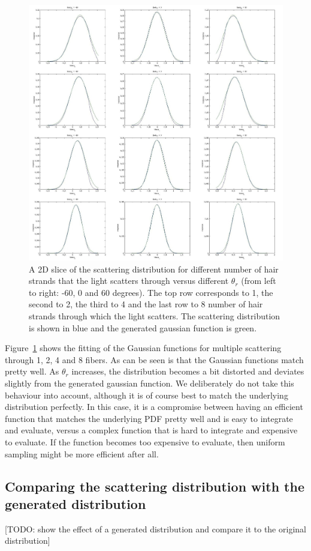\documentclass[11pt,a4paper]{report}
\begin{document}
\begin{figure}[h]
\begin{center}
\includegraphics[scale=0.20]{images/graphfitting/fitting_combined.jpg}
\caption{A 2D slice of the scattering distribution for different number of hair strands that the light scatters through versus different $\theta_r$ (from left to right: -60, 0 and 60 degrees). The top row corresponds to 1, the second to 2, the third to 4 and the last row to 8 number of hair strands through which the light scatters. The scattering distribution is shown in blue and the generated gaussian function is green.}
\label{fitting}

\end{center}
\end{figure}

Figure~\ref{fitting} shows the fitting of the Gaussian functions for multiple scattering through 1, 2, 4 and 8 fibers. As can be seen is that the Gaussian functions match pretty well. As $\theta_r$ increases, the distribution becomes a bit distorted and deviates slightly from the generated gaussian function. We deliberately do not take this behaviour into account, although it is of course best to match the underlying distribution perfectly. In this case, it is a compromise between having an efficient function that matches the underlying PDF pretty well and is easy to integrate and evaluate, versus a complex function that is hard to integrate and expensive to evaluate. If the function becomes too expensive to evaluate, then uniform sampling might be more efficient after all.



\subsection{Comparing the scattering distribution with the generated distribution}
[TODO: show the effect of a generated distribution and compare it to the original distribution]
\end{document}
